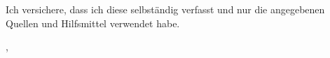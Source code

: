 \thispagestyle{empty}
\vspace*{0.8\textheight}
\noindent
Ich versichere, dass ich diese \getDoctype{} selbständig verfasst und nur die angegebenen Quellen und Hilfsmittel verwendet habe.

\vspace{19mm}
\noindent
\getSubmissionLocation{}, \getSubmissionDate{} \hspace{75mm} \getAuthor{}
